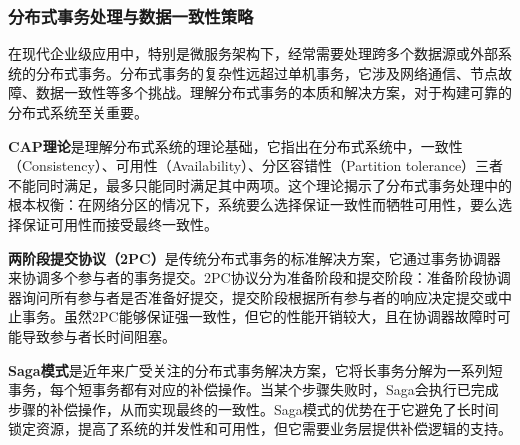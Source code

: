 \begin{Shaded}
\begin{Highlighting}[]
    \OperatorTok{(}\OperatorTok{=}\OperatorTok{,}\OperatorTok{=} \OperatorTok{)}
    \OperatorTok{(}\OperatorTok{)} \OperatorTok{\{}
        \OperatorTok{(}\OperatorTok{(}\OperatorTok{);}
    \OperatorTok{\}}
\OperatorTok{\}}
\end{Highlighting}
\end{Shaded}

\subsubsection{分布式事务处理与数据一致性策略}\label{ux5206ux5e03ux5f0fux4e8bux52a1ux5904ux7406ux4e0eux6570ux636eux4e00ux81f4ux6027ux7b56ux7565}

在现代企业级应用中，特别是微服务架构下，经常需要处理跨多个数据源或外部系统的分布式事务。分布式事务的复杂性远超过单机事务，它涉及网络通信、节点故障、数据一致性等多个挑战。理解分布式事务的本质和解决方案，对于构建可靠的分布式系统至关重要。

\textbf{CAP理论}是理解分布式系统的理论基础，它指出在分布式系统中，一致性（Consistency）、可用性（Availability）、分区容错性（Partition tolerance）三者不能同时满足，最多只能同时满足其中两项。这个理论揭示了分布式事务处理中的根本权衡：在网络分区的情况下，系统要么选择保证一致性而牺牲可用性，要么选择保证可用性而接受最终一致性。

\textbf{两阶段提交协议（2PC）}是传统分布式事务的标准解决方案，它通过事务协调器来协调多个参与者的事务提交。2PC协议分为准备阶段和提交阶段：准备阶段协调器询问所有参与者是否准备好提交，提交阶段根据所有参与者的响应决定提交或中止事务。虽然2PC能够保证强一致性，但它的性能开销较大，且在协调器故障时可能导致参与者长时间阻塞。

\textbf{Saga模式}是近年来广受关注的分布式事务解决方案，它将长事务分解为一系列短事务，每个短事务都有对应的补偿操作。当某个步骤失败时，Saga会执行已完成步骤的补偿操作，从而实现最终的一致性。Saga模式的优势在于它避免了长时间锁定资源，提高了系统的并发性和可用性，但它需要业务层提供补偿逻辑的支持。

